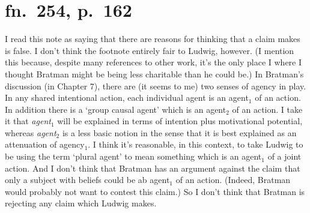 \documentclass[12pt,letterpaper]{extarticle}
\begin{document}
\setlength\footnotesep{1em}




\maketitle





\section{fn.\ 254, p.\ 162}
I read this note as saying that there are reasons for thinking that a claim \citet{ludwig_collective_2007} makes is false.
I don't think the footnote entirely fair to Ludwig, however.
(I mention this because, despite many references to other work, it's the only place I where I thought Bratman might be being less charitable than he could be.)
In Bratman's discussion (in Chapter 7), there are (it seems to me) two senses of agency in play.
In any shared intentional action, each individual agent is an agent$_1$ of an action.
In addition there is a `group causal agent' which is an agent$_2$ of an action.
I take it that \emph{agent$_1$} will be explained in terms of intention plus motivational potential, whereas \emph{agent$_2$} is a less basic notion in the sense that it is best explained as an attenuation of agency$_1$.
I think it's reasonable, in this context, to take Ludwig to be using the term `plural agent' to mean something which is an agent$_1$ of a joint action.
And I don't think that Bratman has an argument against the claim that only a subject with beliefs could be ab agent$_1$ of an action.
(Indeed, Bratman would probably not want to contest this claim.)
So I don't think that Bratman is rejecting any claim which Ludwig makes.
\end{document}
